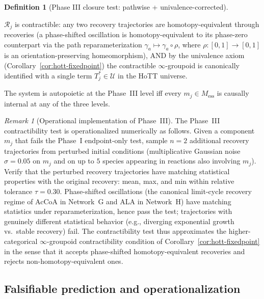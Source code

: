 \documentclass[11pt,a4paper]{article}
\theoremstyle{plain}
\theoremstyle{definition}
\newtheorem{definition}[theorem]{Definition}
\theoremstyle{remark}
\newtheorem{remark}[theorem]{Remark}
\begin{document}
\begin{definition}[Phase III closure test: pathwise + univalence-corrected]
\begin{enumerate}[leftmargin=*, itemsep=2pt]
  $\mathcal{R}_j$ is contractible: any two recovery trajectories are
  homotopy-equivalent through recoveries (a phase-shifted oscillation
  is homotopy-equivalent to its phase-zero counterpart via the path
  reparameterization $\gamma_a \mapsto \gamma_a \circ \rho$, where
  $\rho : [0,1] \to [0,1]$ is an orientation-preserving homeomorphism),
  AND by the univalence axiom
  (Corollary~\ref{cor:hott-fixedpoint}) the contractible
  $\infty$-groupoid is canonically identified with a single term
  $T_j^* \in \mathcal{U}$ in the HoTT universe.
\end{enumerate}
The system is autopoietic at the Phase~III level iff every $m_j \in
M_{\mathrm{ess}}$ is causally internal at any of the three levels.
\end{definition}

\begin{remark}[Operational implementation of Phase~III]
\label{rem:phase3-operational}
The Phase~III contractibility test is operationalized numerically as
follows. Given a component $m_j$ that
fails the Phase~I endpoint-only test, sample $n = 2$ additional recovery
trajectories from perturbed initial conditions (multiplicative Gaussian
noise $\sigma = 0.05$ on $m_j$ and on up to $5$ species appearing in
reactions also involving $m_j$). Verify that the perturbed recovery
trajectories have matching statistical properties with the original
recovery: mean, max, and min within relative tolerance
$\tau = 0.30$. Phase-shifted oscillations (the canonical limit-cycle
recovery regime of AcCoA in Network~G and ALA in Network~H) have
matching statistics under reparameterization, hence pass the test;
trajectories with genuinely different statistical behavior (e.g.,
diverging exponential growth vs.\ stable recovery) fail. The
contractibility test thus approximates the higher-categorical
$\infty$-groupoid contractibility condition of Corollary~\ref{cor:hott-fixedpoint}
in the sense that it accepts phase-shifted homotopy-equivalent
recoveries and rejects non-homotopy-equivalent ones.
\end{remark}

\subsection{Falsifiable prediction and operationalization}
\end{document}
